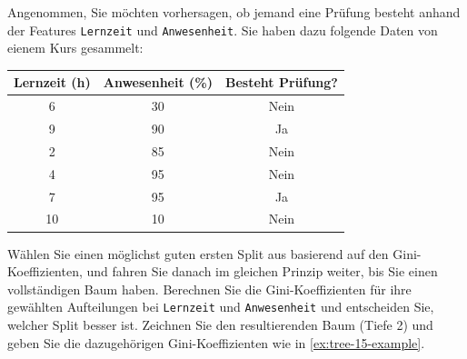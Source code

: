 \begin{myexercise}
    \label{ex:tree-15}
    Angenommen, Sie möchten vorhersagen, ob jemand eine Prüfung besteht anhand der Features \texttt{Lernzeit} und \texttt{Anwesenheit}. Sie haben dazu folgende Daten von eienem Kurs gesammelt:
    \begin{center}
        \begin{tabular}{cc|c}
            \toprule
            Lernzeit (h) & Anwesenheit (\%) & Besteht Prüfung? \\
            \midrule
            6            & 30               & Nein             \\
            9            & 90               & Ja               \\
            2            & 85               & Nein             \\
            4            & 95               & Nein             \\
            7            & 95               & Ja               \\
            10           & 10               & Nein             \\
            \bottomrule
        \end{tabular}
    \end{center}
    Wählen Sie einen möglichst guten ersten Split aus basierend auf den Gini-Koeffizienten, und fahren Sie danach im gleichen Prinzip weiter, bis Sie einen vollständigen Baum haben. Berechnen Sie die Gini-Koeffizienten für ihre gewählten Aufteilungen bei \texttt{Lernzeit} und \texttt{Anwesenheit} und entscheiden Sie, welcher Split besser ist. Zeichnen Sie den resultierenden Baum (Tiefe 2) und geben Sie die dazugehörigen Gini-Koeffizienten wie in \cref{ex:tree-15-example}.


\end{myexercise}
